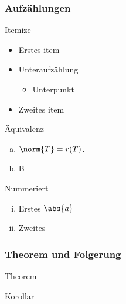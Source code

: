 \documentclass[%
	,ngerman
	,hyperref={%
		,bookmarks
		,colorlinks=true
		,citecolor=blue
		,linkcolor=blue
		,urlcolor=blue
			}
	,smaller
	]{beamer}
\begin{document}
\begin{frame}[allowframebreaks]
	\frametitle{Aufzählungen}
%
\begin{block}{Itemize}
	\begin{itemize}

		\item 
		Erstes item
		
		\item
		Unteraufzählung
		
		\begin{itemize}
		
		\item
		Unterpunkt
		
		\end{itemize}
		
		\item
		Zweites item
		
	\end{itemize}
%
\end{block}	

\framebreak

\begin{block}{Äquivalenz}
	\begin{enumerate}[(a)]
		\item 
		$ \norm{ T } = r(T) $.
		
		\item
		B
	\end{enumerate}
\end{block}

\begin{block}{Nummeriert}
	\begin{enumerate}[(i)]
		\item 
		Erstes $ \abs{a} $
		
		\item
		Zweites
	\end{enumerate}
\end{block}
%
\end{frame}

\begin{frame}
	\frametitle{Theorem und Folgerung}
	
	\begin{theorem}
		Theorem
	\end{theorem}
	
	\begin{corollary}
		Korollar
	\end{corollary}
\end{frame}

\end{document}
